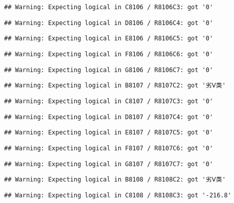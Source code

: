 \documentclass[
]{article}
\begin{document}
\begin{verbatim}
## Warning: Expecting logical in C8106 / R8106C3: got '0'
\end{verbatim}

\begin{verbatim}
## Warning: Expecting logical in D8106 / R8106C4: got '0'
\end{verbatim}

\begin{verbatim}
## Warning: Expecting logical in E8106 / R8106C5: got '0'
\end{verbatim}

\begin{verbatim}
## Warning: Expecting logical in F8106 / R8106C6: got '0'
\end{verbatim}

\begin{verbatim}
## Warning: Expecting logical in G8106 / R8106C7: got '0'
\end{verbatim}

\begin{verbatim}
## Warning: Expecting logical in B8107 / R8107C2: got '劣Ⅴ类'
\end{verbatim}

\begin{verbatim}
## Warning: Expecting logical in C8107 / R8107C3: got '0'
\end{verbatim}

\begin{verbatim}
## Warning: Expecting logical in D8107 / R8107C4: got '0'
\end{verbatim}

\begin{verbatim}
## Warning: Expecting logical in E8107 / R8107C5: got '0'
\end{verbatim}

\begin{verbatim}
## Warning: Expecting logical in F8107 / R8107C6: got '0'
\end{verbatim}

\begin{verbatim}
## Warning: Expecting logical in G8107 / R8107C7: got '0'
\end{verbatim}

\begin{verbatim}
## Warning: Expecting logical in B8108 / R8108C2: got '劣Ⅴ类'
\end{verbatim}

\begin{verbatim}
## Warning: Expecting logical in C8108 / R8108C3: got '-216.8'
\end{verbatim}
\end{document}
